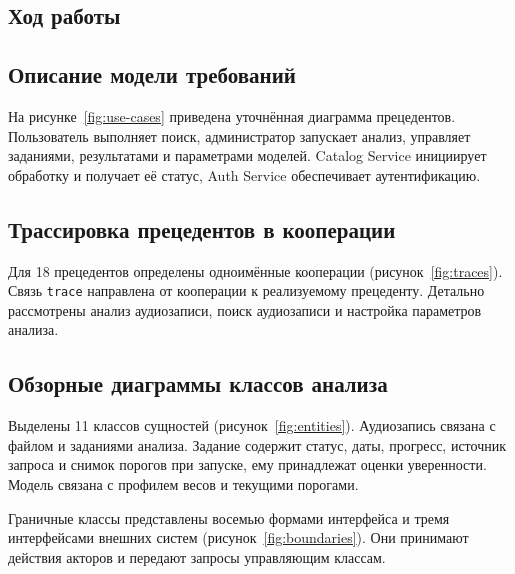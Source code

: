 \begin{reportSheet}
\section{Ход работы}

\subsection{Описание модели требований}

На рисунке~\ref{fig:use-cases} приведена уточнённая диаграмма прецедентов.
Пользователь выполняет поиск, администратор запускает анализ, управляет
заданиями, результатами и параметрами моделей. Catalog Service инициирует
обработку и получает её статус, Auth Service обеспечивает аутентификацию.

\end{reportSheet}

\begin{reportSheet}
\subsection{Трассировка прецедентов в кооперации}

Для 18 прецедентов определены одноимённые кооперации
(рисунок~\ref{fig:traces}). Связь \texttt{trace} направлена от кооперации
к реализуемому прецеденту. Детально рассмотрены анализ аудиозаписи,
поиск аудиозаписи и настройка параметров анализа.

\end{reportSheet}

\subsection{Обзорные диаграммы классов анализа}

Выделены 11 классов сущностей (рисунок~\ref{fig:entities}).
Аудиозапись связана с файлом и заданиями анализа. Задание содержит
статус, даты, прогресс, источник запроса и снимок порогов при запуске,
ему принадлежат оценки уверенности. Модель связана с профилем весов
и текущими порогами.

\clearpage

Граничные классы представлены восемью формами интерфейса и тремя
интерфейсами внешних систем (рисунок~\ref{fig:boundaries}). Они принимают
действия акторов и передают запросы управляющим классам.

